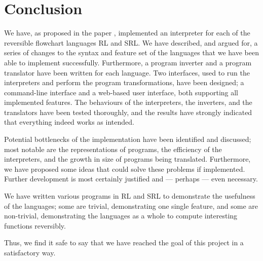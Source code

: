 \chapter*{Conclusion}
 

We have, as proposed in the paper \cite{REV}, implemented an interpreter for each of the reversible flowchart languages RL and SRL. We have described, and argued for, a series of changes to the syntax and feature set of the languages that we have been able to implement successfully. Furthermore, a program inverter and a program translator have been written for each language. Two interfaces, used to run the interpreters and perform the program transformations, have been designed; a command-line interface and a web-based user interface, both supporting all implemented features. The behaviours of the interpreters, the inverters, and the translators have been tested thoroughly, and the results have strongly indicated that everything indeed works as intended.

Potential bottlenecks of the implementation have been identified and discussed; most notable are the representations of programs, the efficiency of the interpreters, and the growth in size of programs being translated. Furthermore, we have proposed some ideas that could solve these problems if implemented. Further development is most certainly justified and --- perhaps --- even necessary.

We have written various programs in RL and SRL to demonstrate the usefulness of the languages; some are trivial, demonstrating one single feature, and some are non-trivial, demonstrating the languages as a whole to compute interesting functions reversibly.


Thus, we find it safe to say that we have reached the goal of this project in a satisfactory way. %
